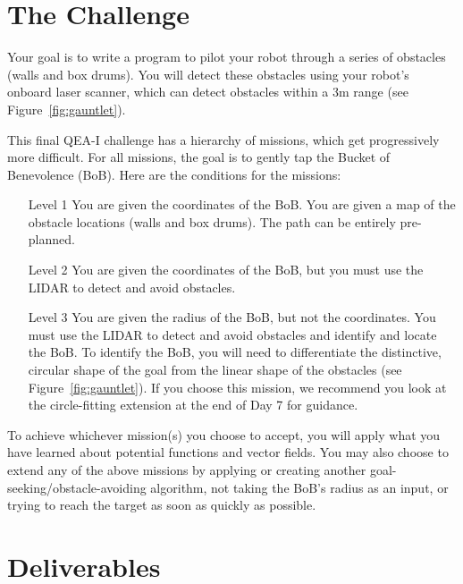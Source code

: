 \documentclass{tufte-handout}
\begin{document}
\section{The Challenge}

Your goal is to write a program to pilot your robot through a series of obstacles (walls and box drums).  You will detect these obstacles using your robot's onboard laser scanner, which can detect obstacles within a 3m range (see Figure~\ref{fig:gauntlet}).

This final QEA-I challenge has a hierarchy of missions, which get progressively more difficult. For all missions, the goal is to gently tap the Bucket of Benevolence (BoB). Here are the conditions for the missions:
\begin{enumerate}
\item [Level 1] You are given the coordinates of the BoB. You are given a map of the obstacle locations (walls and box drums). The path can be entirely pre-planned.
\item [Level 2] You are given the coordinates of the BoB, but you must use the LIDAR to detect and avoid obstacles. 
\item [Level 3] You are given the radius of the BoB, but not the coordinates. You must use the LIDAR to detect and avoid obstacles and identify and locate the BoB. To identify the BoB, you will need to differentiate the distinctive, circular shape of the goal from the linear shape of the obstacles  (see Figure~\ref{fig:gauntlet}). If you choose this mission, we recommend you look at the circle-fitting extension at the end of Day 7 for guidance.
\end{enumerate}

To achieve whichever mission(s) you choose to accept, you will apply what you have learned about potential functions and vector fields.  You may also choose to extend any of the above missions by applying or creating another goal-seeking/obstacle-avoiding algorithm, not taking the BoB's radius as an input, or trying to reach the target as soon as quickly as possible.

\section{Deliverables}

\end{document}
